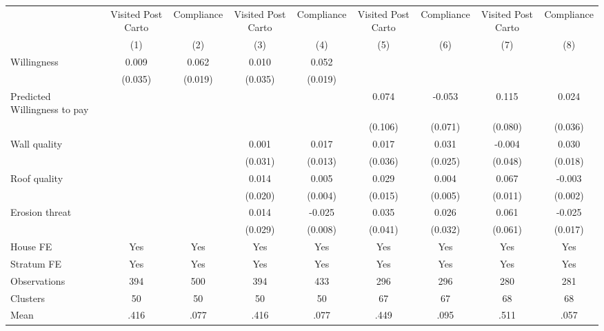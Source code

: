 \begin{tabular}{l*{8}{c}}
\toprule
                &\multicolumn{1}{c}{Visited Post Carto}&\multicolumn{1}{c}{Compliance}&\multicolumn{1}{c}{Visited Post Carto}&\multicolumn{1}{c}{Compliance}&\multicolumn{1}{c}{Visited Post Carto}&\multicolumn{1}{c}{Compliance}&\multicolumn{1}{c}{Visited Post Carto}&\multicolumn{1}{c}{Compliance}\\
                &\multicolumn{1}{c}{(1)}&\multicolumn{1}{c}{(2)}&\multicolumn{1}{c}{(3)}&\multicolumn{1}{c}{(4)}&\multicolumn{1}{c}{(5)}&\multicolumn{1}{c}{(6)}&\multicolumn{1}{c}{(7)}&\multicolumn{1}{c}{(8)}\\
\midrule
Willingness     &    0.009&    0.062&    0.010&    0.052&         &         &         &         \\
                &  (0.035)&  (0.019)&  (0.035)&  (0.019)&         &         &         &         \\
Predicted Willingness to pay&         &         &         &         &    0.074&   -0.053&    0.115&    0.024\\
                &         &         &         &         &  (0.106)&  (0.071)&  (0.080)&  (0.036)\\
Wall quality    &         &         &    0.001&    0.017&    0.017&    0.031&   -0.004&    0.030\\
                &         &         &  (0.031)&  (0.013)&  (0.036)&  (0.025)&  (0.048)&  (0.018)\\
Roof quality    &         &         &    0.014&    0.005&    0.029&    0.004&    0.067&   -0.003\\
                &         &         &  (0.020)&  (0.004)&  (0.015)&  (0.005)&  (0.011)&  (0.002)\\
Erosion threat  &         &         &    0.014&   -0.025&    0.035&    0.026&    0.061&   -0.025\\
                &         &         &  (0.029)&  (0.008)&  (0.041)&  (0.032)&  (0.061)&  (0.017)\\
House FE        &      Yes&      Yes&      Yes&      Yes&      Yes&      Yes&      Yes&      Yes\\
Stratum FE      &      Yes&      Yes&      Yes&      Yes&      Yes&      Yes&      Yes&      Yes\\
\midrule
Observations    &      394&      500&      394&      433&      296&      296&      280&      281\\
Clusters        &       50&       50&       50&       50&       67&       67&       68&       68\\
Mean            &     .416&     .077&     .416&     .077&     .449&     .095&     .511&     .057\\
\bottomrule
\end{tabular}
